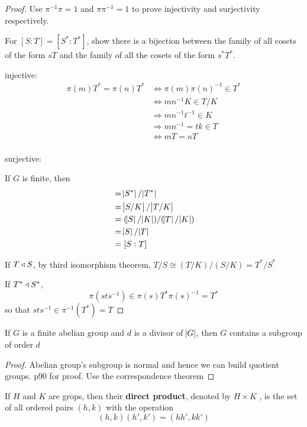 \documentclass[11pt]{article}
\begin{document}
\begin{proof}
Use \(\pi^{-1}\pi=1\) and \(\pi\pi^{-1}=1\) to prove injectivity and surjectivity
respectively. 

For \([S:T]=[S^*:T^*]\), show there is a bijection between the family of all
cosets of the form \(sT\) and the family of all the cosets of the form
\(s^*T^*\).

injective:
\begin{align*}
\pi(m)T^*=\pi(n)T^*&\Leftrightarrow \pi(m)\pi(n)^{-1}\in T^*\\
&\Leftrightarrow mn^{-1}K\in T/K\\
&\Rightarrow mn^{-1}t^{-1}\in K\\
&\Rightarrow mn^{-1}=tk\in T\\
&\Leftrightarrow mT=nT\\
\end{align*}

surjective:


If \(G\) is finite, then
\begin{align*}
[S^*:T^*]&=\abs{S^*}/\abs{T^*}\\
&=\abs{S/K}/\abs{T/K}\\
&=(\abs{S}/\abs{K})/(\abs{T}/\abs{K})\\
&=\abs{S}/\abs{T}\\
&=[S:T]
\end{align*}

If \(T\triangleleft S\), by third isomorphism theorem, \(T/S\cong (T/K)/(S/K)=T^*/S^*\)

If \(T^*\triangleleft S^*\), 
\begin{equation*}
\pi(sts^{-1})\in \pi(s)T^*\pi(s)^{-1}=T^*
\end{equation*}
so that \(sts^{-1}\in \pi^{-1}(T^*)=T\)
\end{proof}


\begin{proposition}[]
\label{prop2.71}
If \(G\) is a finite abelian group and \(d\) is a divisor of \(\abs{G}\), then \(G\)
contains a subgroup of order \(d\)
\end{proposition}

\begin{proof}
Abelian group's subgroup is normal and hence we can build quotient groups.
p90 for proof. Use the correspondence theorem
\end{proof}

\begin{definition}[]
If \(H\) and \(K\) are grops, then their \textbf{direct product}, denoted by 
\(H\times K\) 
, is the set of all ordered pairs \((h,k)\) with the operation
\begin{equation*}
(h,k)(h',k')=(hh',kk')
\end{equation*}
\end{definition}
\end{document}
